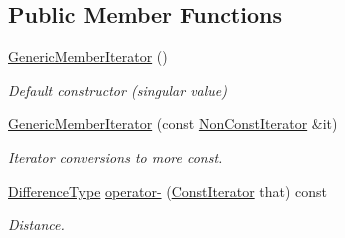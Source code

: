 \subsection*{Public Member Functions}
\begin{DoxyCompactItemize}
\item 
\hyperlink{class_generic_member_iterator_a2708717d497a0aadacdf75900de4c5b4}{Generic\+Member\+Iterator} ()
\begin{DoxyCompactList}\small\item\em Default constructor (singular value) \end{DoxyCompactList}\item 
\hyperlink{class_generic_member_iterator_a2697fd327a90654b0bf91c988e43f95e}{Generic\+Member\+Iterator} (const \hyperlink{class_generic_member_iterator_abc26eb06f2962765b11dcd06ce84ac02}{Non\+Const\+Iterator} \&it)
\begin{DoxyCompactList}\small\item\em Iterator conversions to more const. \end{DoxyCompactList}\item 
\hypertarget{class_generic_member_iterator_a056851821e75c4be13b297604bc37c0b}{}\hyperlink{class_generic_member_iterator_a902b99c8ae351cd7626514dc5f30740a}{Difference\+Type} \hyperlink{class_generic_member_iterator_a056851821e75c4be13b297604bc37c0b}{operator-\/} (\hyperlink{class_generic_member_iterator_ae5be27a73dce0be58ee2776db896d591}{Const\+Iterator} that) const \label{class_generic_member_iterator_a056851821e75c4be13b297604bc37c0b}

\begin{DoxyCompactList}\small\item\em Distance. \end{DoxyCompactList}\end{DoxyCompactItemize}
